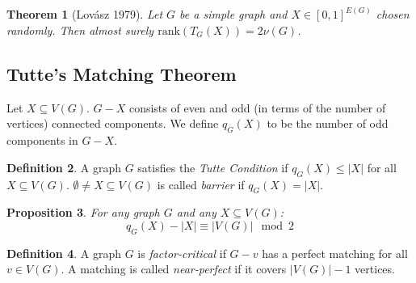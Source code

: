 \documentclass[11pt, a4paper]{article}
\newcommand{\abs}[1]{\left\lvert#1\right\rvert}
\newtheorem{theorem}{Theorem}[section]
\newtheorem{prop}[theorem]{Proposition}
\theoremstyle{remark}
\theoremstyle{definition}
\newtheorem{definition}[theorem]{Definition}
\begin{document}
\begin{theorem}[Lovász 1979]
	Let $G$ be a simple graph and $X\in [0,1]^{E(G)}$ chosen randomly.
	Then almost surely $\mathrm{rank}(T_G(X))=2\nu(G)$.
\end{theorem}

\subsection{Tutte's Matching Theorem}
Let $X\subseteq V(G)$. $G-X$ consists of even and odd (in terms of
the number of vertices) connected components. We define $q_G(X)$ to
be the number of odd components in $G-X$.

\begin{figure}[tbh]
	\centering
\end{figure}

\begin{definition}
	A graph $G$ satisfies the \emph{Tutte Condition} if $q_G(X)\leq\abs{X}$
	for all $X\subseteq V(G)$. $\emptyset\neq X\subseteq V(G)$ is called
	\emph{barrier} if $q_G(X)=\abs{X}$.
\end{definition}

\begin{prop}\label{prop:tutte-even}
	For any graph $G$ and any $X\subseteq V(G)$:
	\[q_G(X)-\abs{X} \equiv \abs{V(G)}\mod 2\]
\end{prop}

\begin{definition}
	A graph $G$ is \emph{factor-critical} if $G-v$ has a perfect matching
	for all $v\in V(G)$. A matching is called \emph{near-perfect} if it
	covers $\abs{V(G)}-1$ vertices.
\end{definition}
\end{document}
